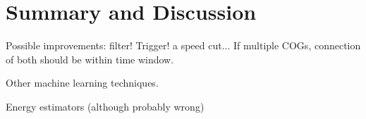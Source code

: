 \chapter{Summary and Discussion}

Possible improvements: filter! Trigger! a speed cut... If multiple COGs, connection of both should be within time window.

Other machine learning techniques.

Energy estimators (although probably wrong)